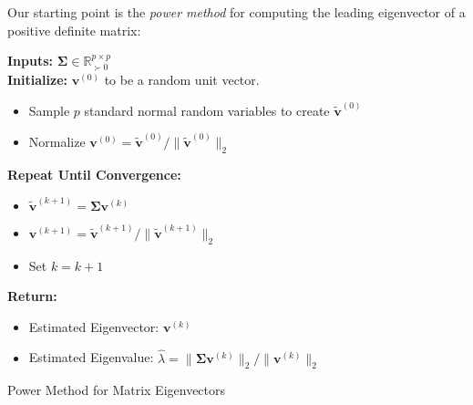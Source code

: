 \documentclass[10pt]{article}
\newcommand{\R}{\mathbb{R}}
\newcommand{\bSigma}{\bm{\Sigma}}
\newcommand{\bv}{\bm{v}}
\begin{document}
Our starting point is the \emph{power method} for computing the leading eigenvector of a positive definite matrix: 
\begin{algorithm}
\textbf{Inputs:} $\bSigma \in \R^{p \times p}_{\succ 0}$\\
\textbf{Initialize:} $\bv^{(0)}$ to be a random unit vector. 
\begin{itemize}
    \item Sample $p$ standard normal random variables to create $\tilde{\bv}^{(0)}$
    \item Normalize $\bv^{(0)} = \tilde{\bv}^{(0)} / \|\tilde{\bv}^{(0)}\|_2$
\end{itemize}
\textbf{Repeat Until Convergence:}
\begin{itemize}
    \item $\tilde{\bv}^{(k+1)} = \bSigma \bv^{(k)}$
    \item $\bv^{(k+1)} = \tilde{\bv}^{(k+1)} / \|\tilde{\bv}^{(k+1)}\|_2$
    \item Set $k = k + 1$
\end{itemize}
\textbf{Return:}
\begin{itemize}
    \item Estimated Eigenvector: $\bv^{(k)}$
    \item Estimated Eigenvalue: $\hat{\lambda} = \|\bSigma \bv^{(k)}\|_2 / \|\bv^{(k)}\|_2$
\end{itemize}
    \caption{Power Method for Matrix Eigenvectors}
    \label{alg:pm}
\end{algorithm}
\end{document}
